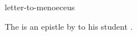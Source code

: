 \documentclass{stex}
\begin{document}
\begin{smodule}{letter-to-menoeceus}
\begin{sparagraph}[style=symdoc]
The  is an epistle by  to his student
.
\end{sparagraph}
\end{smodule}
\end{document}
